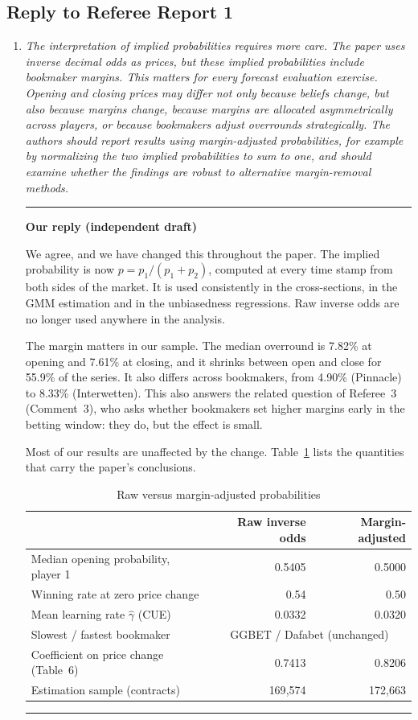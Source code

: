 \documentclass[letterpaper,12pt]{article}
\newcounter{b}
\newenvironment{ourreply}
  {\par\medskip\noindent\textcolor{ourcol}{\rule{\linewidth}{1pt}}%
   \par\nobreak\vspace{3pt}%
   \noindent\textbf{\textcolor{ourcol}{Our reply (independent draft)}}%
   \par\nobreak\vspace{3pt}}
  {\par\vspace{3pt}%
   \noindent\textcolor{ourcol}{\rule{\linewidth}{0.4pt}}\par\medskip}
\begin{document}
\subsection*{Reply to Referee Report 1}
\begin{enumerate}
\item \textit{ The interpretation of implied probabilities requires more care. The paper uses inverse
decimal odds as prices, but these implied probabilities include bookmaker margins.
This matters for every forecast evaluation exercise. Opening and closing prices may
differ not only because beliefs change, but also because margins change, because
margins are allocated asymmetrically across players, or because bookmakers adjust
overrounds strategically. The authors should report results using margin-adjusted
probabilities, for example by normalizing the two implied probabilities to sum to one, and should examine whether the findings are robust to alternative margin-removal
methods.}

\begin{ourreply}
We agree, and we have changed this throughout the paper. The implied
probability is now $p = p_1 / (p_1 + p_2)$, computed at every time stamp from
both sides of the market. It is used consistently in the cross-sections, in
the GMM estimation and in the unbiasedness regressions. Raw inverse odds are
no longer used anywhere in the analysis.

The margin matters in our sample. The median overround is 7.82\% at opening
and 7.61\% at closing, and it shrinks between open and close for 55.9\% of
the series. It also differs across bookmakers, from 4.90\% (Pinnacle) to
8.33\% (Interwetten). This also answers the related question of Referee~3
(Comment~3), who asks whether bookmakers set higher margins early in the
betting window: they do, but the effect is small.

Most of our results are unaffected by the change. Table~\ref{tab:r1c1} lists
the quantities that carry the paper's conclusions.

\begin{table}[h]
\centering
\caption{Raw versus margin-adjusted probabilities}
\label{tab:r1c1}
\small
\begin{tabular}{lrr}
\toprule
 & Raw inverse odds & Margin-adjusted \\
\midrule
Median opening probability, player 1  & 0.5405 & 0.5000 \\
Winning rate at zero price change     & 0.54   & 0.50 \\
Mean learning rate $\hat{\gamma}$ (CUE) & 0.0332 & 0.0320 \\
Slowest / fastest bookmaker           & \multicolumn{2}{c}{GGBET / Dafabet (unchanged)} \\
Coefficient on price change (Table~6) & 0.7413 & 0.8206 \\
Estimation sample (contracts)         & 169{,}574 & 172{,}663 \\
\bottomrule
\end{tabular}
\end{table}


\end{ourreply}
\end{enumerate}
\end{document}
